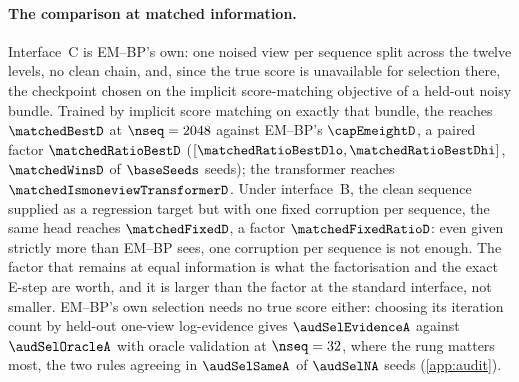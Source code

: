 \paragraph{The comparison at matched information.}
Interface~C is EM--BP's own: one noised view per sequence split across the twelve levels,
no clean chain, and, since the true score is unavailable for selection there, the
checkpoint chosen on the implicit score-matching objective of a held-out noisy bundle.
Trained by implicit score matching on exactly that bundle, the \matchedBestArchD{} reaches
$\matchedBestD$ at $\nseq=2048$ against EM--BP's $\capEmeightD$, a paired factor
$\matchedRatioBestD$ ($[\matchedRatioBestDlo,\matchedRatioBestDhi]$, $\matchedWinsD$ of
$\baseSeeds$ seeds); the transformer reaches $\matchedIsmoneviewTransformerD$. Under
interface~B, the clean sequence supplied as a regression target but with one fixed
corruption per sequence, the same head reaches $\matchedFixedD$, a factor
$\matchedFixedRatioD$: even given strictly more than EM--BP sees, one corruption per
sequence is not enough. The factor that remains at equal information is what the
factorisation and the exact E-step are worth, and it is larger than the factor at the
standard interface, not smaller. EM--BP's own selection needs no true score either:
choosing its iteration count by held-out one-view log-evidence gives $\audSelEvidenceA$
against $\audSelOracleA$ with oracle validation at $\nseq=32$, where the rung matters
most, the two rules agreeing in $\audSelSameA$ of $\audSelNA$ seeds (\cref{app:audit}).

